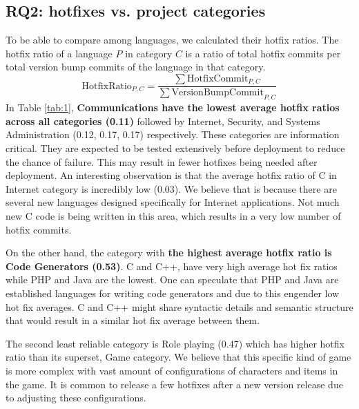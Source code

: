 \documentclass{sig-alternate}
\begin{document}
\subsection{RQ2: hotfixes vs. project categories}
To be able to compare among languages, we calculated their hotfix ratios. The hotfix ratio of a language $P$ in category $C$ is a ratio of total hotfix commits per total version bump commits of the language in that category. %
\begin{equation*}
\mathrm{HotfixRatio}_{P,C} = \frac{\sum{\mathrm{HotfixCommit}_{P,C}}}{\sum{\mathrm{VersionBumpCommit}_{P,C}}}
\end{equation*}
In Table \ref{tab:1}, \textbf{Communications have the lowest average hotfix ratios across all categories (0.11)} followed by Internet, Security, and Systems Administration (0.12, 0.17, 0.17) respectively. These categories are information critical. They are expected to be tested extensively before deployment to reduce the chance of failure. This may result in fewer hotfixes being needed after deployment. An interesting observation is that the average hotfix ratio of C in Internet category is incredibly low (0.03). We believe that is because there are several new languages designed specifically for Internet applications. Not much new C code is being written in this area, which results in a very low number of hotfix commits. %

On the other hand, the category with \textbf{the highest average hotfix ratio is Code Generators (0.53)}. C and C++, have very high average hot fix ratios while  PHP and Java are the lowest. One can speculate that PHP and Java are established languages for writing code generators and due to this engender low hot fix averages. C and C++ might share syntactic details and semantic structure that would result in a similar hot fix average between them. 

The second least reliable category is Role playing (0.47) which has higher hotfix ratio than its superset, Game category. We believe that this specific kind of game is more complex with vast amount of configurations of characters and items in the game. It is common to release a few hotfixes after a new version release due to adjusting these configurations. %
\end{document}
